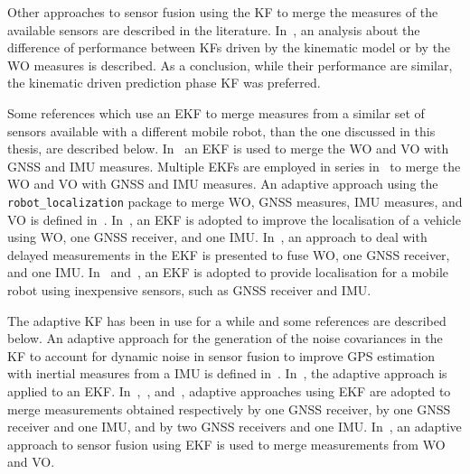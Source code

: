 Other approaches to sensor fusion using the \gls{KF} to merge the measures of the available sensors are described in the literature.
In~\cite{801027}, an analysis about the difference of performance between \glspl{KF} driven by the kinematic model or by the \gls{WO} measures is described. As a conclusion, while their performance are similar, the kinematic driven prediction phase \gls{KF} was preferred.


Some references which use an \gls{EKF} to merge measures from a similar set of sensors available with a different mobile robot, than the one discussed in this thesis, are described below.
In~\cite{9024731} an \gls{EKF} is used to merge the \gls{WO} and \gls{VO} with \gls{GNSS} and \gls{IMU} measures.
Multiple \glspl{EKF} are employed in series in~\cite{9075286} to merge the \gls{WO} and \gls{VO} with \gls{GNSS} and \gls{IMU} measures.
An adaptive approach using the \texttt{robot\_localization} package to merge \gls{WO}, \gls{GNSS} measures, \gls{IMU} measures, and \gls{VO} is defined in~\cite{CHEN1298238}.
In~\cite{magnusson_improving_2012}, an \gls{EKF} is adopted to improve the localisation of a vehicle using \gls{WO}, one \gls{GNSS} receiver, and one \gls{IMU}.
In~\cite{8c506f630d4e478dace903637fa0a75b}, an approach to deal with delayed measurements in the \gls{EKF} is presented to fuse \gls{WO}, one \gls{GNSS} receiver, and one \gls{IMU}.
In~\cite{king_low_2008} and~\cite{skog2005low}, an \gls{EKF} is adopted to provide localisation for a mobile robot using inexpensive sensors, such as \gls{GNSS} receiver and \gls{IMU}.

The adaptive \gls{KF} has been in use for a while and some references are described below.
An adaptive approach for the generation of the noise covariances in the \gls{KF} to account for dynamic noise in sensor fusion to improve \gls{GPS} estimation with inertial measures from a \gls{IMU} is defined in~\cite{mohamed1999adaptive}.
In~\cite{grandoni_sensor_2001}, the adaptive approach is applied to an \gls{EKF}.
In~\cite{kong_using_2012},~\cite{Werries-2016-5519}, and~\cite{hao_modified_2018}, adaptive approaches using \gls{EKF} are adopted to merge measurements obtained respectively by one \gls{GNSS} receiver, by one \gls{GNSS} receiver and one \gls{IMU}, and by two \gls{GNSS} receivers and one \gls{IMU}.
In~\cite{chenavier_position_1992}, an adaptive approach to sensor fusion using \gls{EKF} is used to merge measurements from \gls{WO} and \gls{VO}.


